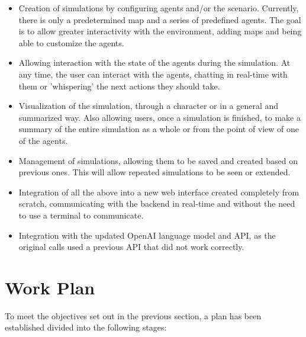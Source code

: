 \begin{itemize}
	\item Creation of simulations by configuring agents and/or the scenario. Currently, there is only a predetermined map and a series of predefined agents. The goal is to allow greater interactivity with the environment, adding maps and being able to customize the agents.
	
	\item Allowing interaction with the state of the agents during the simulation. At any time, the user can interact with the agents, chatting in real-time with them or 'whispering' the next actions they should take.
	
	\item Visualization of the simulation, through a character or in a general and summarized way. Also allowing users, once a simulation is finished, to make a summary of the entire simulation as a whole or from the point of view of one of the agents.
	
	\item Management of simulations, allowing them to be saved and created based on previous ones. This will allow repeated simulations to be seen or extended.
	
	\item Integration of all the above into a new web interface created completely from scratch, communicating with the backend in real-time and without the need to use a terminal to communicate.
	
	\item Integration with the updated OpenAI language model and API, as the original calls used a previous API that did not work correctly.
	
\end{itemize}


\section{Work Plan}
To meet the objectives set out in the previous section, a plan has been established divided into the following stages:

